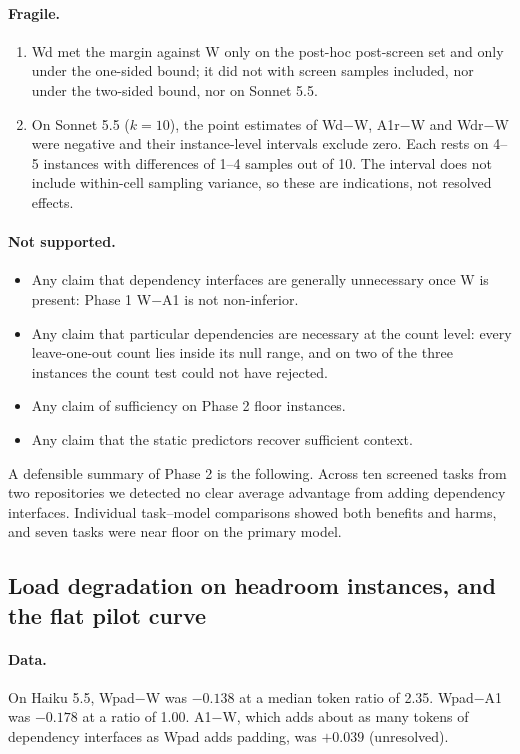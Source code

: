 \paragraph{Fragile.}
\begin{enumerate}
\item Wd met the margin against W only on the post-hoc post-screen set and only under the one-sided bound; it did not with screen samples included, nor under the two-sided bound, nor on Sonnet 5.5.
\item On Sonnet 5.5 ($k=10$), the point estimates of Wd$-$W, A1r$-$W and Wdr$-$W were negative and their instance-level intervals exclude zero. Each rests on 4--5 instances with differences of 1--4 samples out of 10. The interval does not include within-cell sampling variance, so these are indications, not resolved effects.
\end{enumerate}

\paragraph{Not supported.}
\begin{itemize}
\item Any claim that dependency interfaces are generally unnecessary once W is present: Phase 1 W$-$A1 is not non-inferior.
\item Any claim that particular dependencies are necessary at the count level: every leave-one-out count lies inside its null range, and on two of the three instances the count test could not have rejected.
\item Any claim of sufficiency on Phase 2 floor instances.
\item Any claim that the static predictors recover sufficient context.
\end{itemize}

A defensible summary of Phase 2 is the following. Across ten screened tasks from two repositories we detected no clear average advantage from adding dependency interfaces. Individual task--model comparisons showed both benefits and harms, and seven tasks were near floor on the primary model.

\subsection{Load degradation on headroom instances, and the flat pilot curve}

\paragraph{Data.} On Haiku 5.5, Wpad$-$W was $-0.138$ at a median token ratio of 2.35. Wpad$-$A1 was $-0.178$ at a ratio of 1.00. A1$-$W, which adds about as many tokens of dependency interfaces as Wpad adds padding, was $+0.039$ (unresolved).

